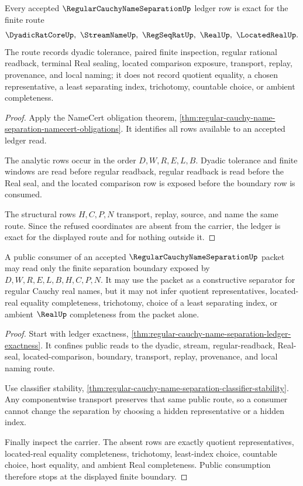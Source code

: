 \begin{theorem}
\label{thm:regular-cauchy-name-separation-ledger-exactness}
Every accepted $\RegularCauchyNameSeparationUp$ ledger row is exact for the finite route
$$
\DyadicRatCoreUp,\ \StreamNameUp,\ \RegSeqRatUp,\ \RealUp,\ \LocatedRealUp.
$$
The route records dyadic tolerance, paired finite inspection, regular rational readback, terminal Real sealing, located comparison exposure, transport, replay, provenance, and local naming; it does not record quotient equality, a chosen representative, a least separating index, trichotomy, countable choice, or ambient completeness.
\end{theorem}
\begin{proof}
Apply the NameCert obligation theorem, \autoref{thm:regular-cauchy-name-separation-namecert-obligations}. It identifies all rows available to an accepted ledger read.

The analytic rows occur in the order $D,W,R,E,L,B$. Dyadic tolerance and finite windows are read before regular readback, regular readback is read before the Real seal, and the located comparison row is exposed before the boundary row is consumed.

The structural rows $H,C,P,N$ transport, replay, source, and name the same route. Since the refused coordinates are absent from the carrier, the ledger is exact for the displayed route and for nothing outside it.
\end{proof}

\begin{theorem}
\label{thm:regular-cauchy-name-separation-public-boundary}
A public consumer of an accepted $\RegularCauchyNameSeparationUp$ packet may read only the finite separation boundary exposed by $D,W,R,E,L,B,H,C,P,N$. It may use the packet as a constructive separator for regular Cauchy real names, but it may not infer quotient representatives, located-real equality completeness, trichotomy, choice of a least separating index, or ambient $\RealUp$ completeness from the packet alone.
\end{theorem}
\begin{proof}
Start with ledger exactness, \autoref{thm:regular-cauchy-name-separation-ledger-exactness}. It confines public reads to the dyadic, stream, regular-readback, Real-seal, located-comparison, boundary, transport, replay, provenance, and local naming route.

Use classifier stability, \autoref{thm:regular-cauchy-name-separation-classifier-stability}. Any componentwise transport preserves that same public route, so a consumer cannot change the separation by choosing a hidden representative or a hidden index.

Finally inspect the carrier. The absent rows are exactly quotient representatives, located-real equality completeness, trichotomy, least-index choice, countable choice, host equality, and ambient Real completeness. Public consumption therefore stops at the displayed finite boundary.
\end{proof}

